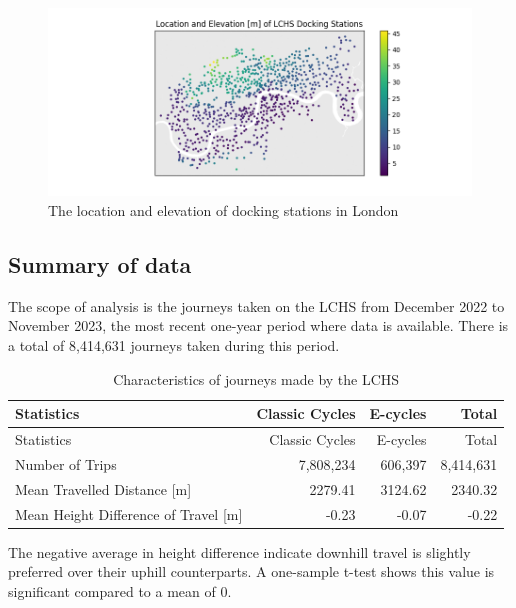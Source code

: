 \documentclass[
  12pt,
  a4paper,
  DIV=11,
  numbers=noendperiod]{scrartcl}
\begin{document}
\begin{figure}

{\centering \includegraphics{img/docking_stations.png}

}

\caption{The location and elevation of docking stations in London}

\end{figure}

\hypertarget{summary-of-data}{%
\subsection{Summary of data}\label{summary-of-data}}

The scope of analysis is the journeys taken on the LCHS from December
2022 to November 2023, the most recent one-year period where data is
available. There is a total of 8,414,631 journeys taken during this
period.

\begin{longtable}[]{@{}lrrr@{}}
\caption{Characteristics of journeys made by the LCHS}\tabularnewline
\toprule\noalign{}
Statistics & Classic Cycles & E-cycles & Total \\
\midrule\noalign{}
\endfirsthead
\toprule\noalign{}
Statistics & Classic Cycles & E-cycles & Total \\
\midrule\noalign{}
\endhead
\bottomrule\noalign{}
\endlastfoot
Number of Trips & 7,808,234 & 606,397 & 8,414,631 \\
Mean Travelled Distance {[}m{]} & 2279.41 & 3124.62 & 2340.32 \\
Mean Height Difference of Travel {[}m{]} & -0.23 & -0.07 & -0.22 \\
\end{longtable}

The negative average in height difference indicate downhill travel is
slightly preferred over their uphill counterparts. A one-sample t-test
shows this value is significant compared to a mean of 0.
\end{document}
